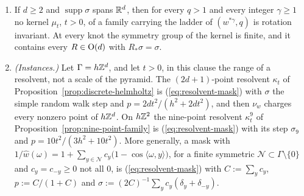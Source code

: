\begin{proposition}
\begin{enumerate}
\item If $d \ge 2$ and $\operatorname{supp}\sigma$ spans $\mathbb{R}^d$, then for every $q > 1$ and every
integer $\gamma \ge 1$ no kernel $\mu_t$, $t > 0$, of a family carrying the ladder of
$(w^{*\gamma}, q)$ is rotation invariant. At every knot the symmetry group of the kernel is
finite, and it contains every $R \in \mathrm{O}(d)$ with $R_*\sigma = \sigma$.
\item \emph{(Instances.)} Let $\Gamma = h\mathbb{Z}^d$, and let $t > 0$, in this clause the range of a
resolvent, not a scale of the pyramid. The $(2d+1)$-point resolvent $\kappa_t$ of
Proposition~\ref{prop:discrete-helmholtz} is (\ref{eq:resolvent-mask}) with $\sigma$ the simple
random walk step and $p = 2dt^2/(h^2 + 2dt^2)$, and then $\nu_w$ charges every nonzero point
of $h\mathbb{Z}^d$. On $h\mathbb{Z}^2$ the nine-point resolvent $\kappa^9_t$ of
Proposition~\ref{prop:nine-point-family} is (\ref{eq:resolvent-mask}) with its step $\sigma_9$ and
$p = 10t^2/(3h^2 + 10t^2)$. More generally, a mask with
$1/\widehat{w}(\omega) = 1 + \sum_{y \in \mathcal{N}}c_y\bigl(1 - \cos\langle\omega, y\rangle\bigr)$,
for a finite symmetric $\mathcal{N} \subset \Gamma \setminus \{0\}$ and $c_y = c_{-y} \ge 0$ not
all $0$, is (\ref{eq:resolvent-mask}) with $C := \sum_yc_y$, $p := C/(1 + C)$ and
$\sigma := (2C)^{-1}\sum_yc_y(\delta_y + \delta_{-y})$.
\end{enumerate}

\end{proposition}
